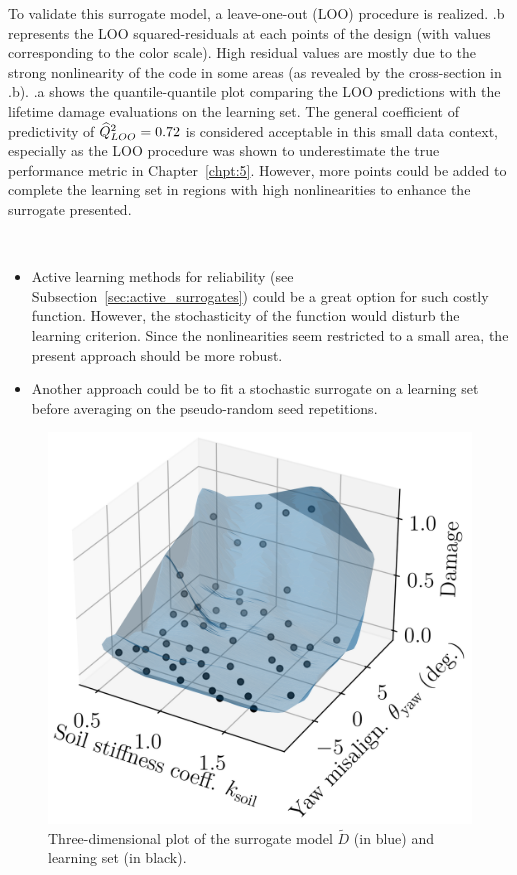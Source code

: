 To validate this surrogate model, a leave-one-out (LOO) procedure is realized. 
.b represents the LOO squared-residuals at each points of the design (with values corresponding to the color scale). 
High residual values are mostly due to the strong nonlinearity of the code in some areas (as revealed by the cross-section in .b).
.a shows the quantile-quantile plot comparing the LOO predictions with the lifetime damage evaluations on the learning set. 
The general coefficient of predictivity of $\widehat{Q}^2_{LOO}=0.72$ is considered acceptable in this small data context, especially as the LOO procedure was shown to underestimate the true performance metric in Chapter~\ref{chpt:5}. 
However, more points could be added to complete the learning set in regions with high nonlinearities to enhance the surrogate presented.  

\begin{remark}
    ~
    \begin{itemize}
        \item Active learning methods for reliability (see Subsection~\ref{sec:active_surrogates}) could be a great option for such costly function. 
        However, the stochasticity of the function would disturb the learning criterion. Since the nonlinearities seem restricted to a small area, the present approach should be more robust. 
        \item Another approach could be to fit a stochastic surrogate \citep{binois_2019_replication,baker_2022_stochastic_surrogates_review,zhu_2023_thesis} on a learning set before averaging on the pseudo-random seed repetitions.  
    \end{itemize} 
\end{remark}

\begin{figure}[h!]
    \centering
    \includegraphics[width=0.45\linewidth]{./part3/figures/OWT/3D_surrogate.png}
    \caption{Three-dimensional plot of the surrogate model $\widetilde{D}$ (in blue) and learning set (in black).}
    \label{fig:3d_owt_surrogate}
\end{figure}

